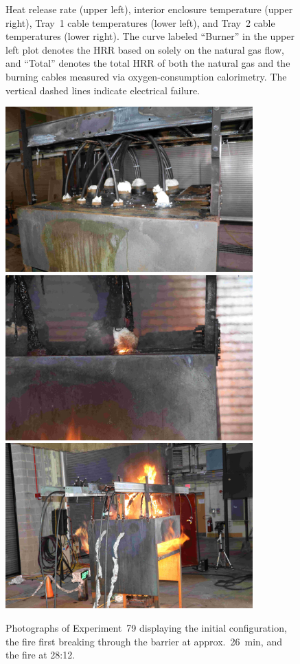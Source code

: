 \begin{figure}[H]
\caption[HRR and temperatures of Experiment 79]{Heat release rate (upper left), interior enclosure temperature (upper right), Tray~1 cable temperatures (lower left), and Tray~2 cable temperatures (lower right). The curve labeled ``Burner'' in the upper left plot denotes the HRR based on solely on the natural gas flow, and ``Total'' denotes the total HRR of both the natural gas and the burning cables measured via oxygen-consumption calorimetry. The vertical dashed lines indicate electrical failure.}
\label{fig:Test_79}
\end{figure}

\begin{figure}[p]
\centering
\includegraphics[height=2.50in]{../FIGURES/Test_79_Photo_1} \\ \vspace{0.1in}
\includegraphics[height=2.50in]{../FIGURES/Test_79_Photo_2} \\ \vspace{0.1in}
\includegraphics[height=2.50in]{../FIGURES/Test_79_Photo_3}
\caption[Photographs of Experiment~79]{Photographs of Experiment~79 displaying the initial configuration, the fire first breaking through the barrier at approx.~26~min, and the fire at 28:12.}
\label{fig:Test_79_photos}
\end{figure}


